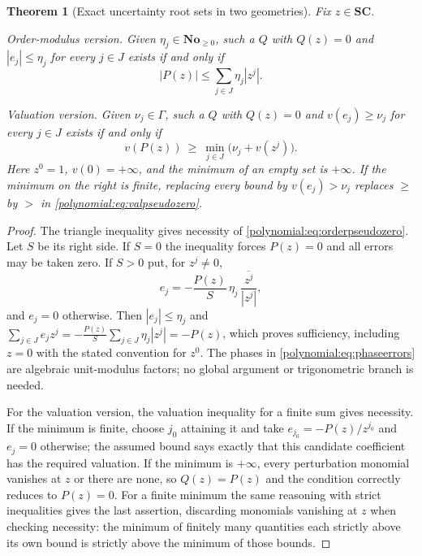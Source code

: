 \documentclass[11pt,letterpaper]{article}
\numberwithin{equation}{section}
\newtheorem{theorem}{Theorem}[section]
\theoremstyle{definition}
\theoremstyle{remark}\newtheorem{remark}[theorem]{Remark}
\newcommand{\No}{\mathbf{No}}
\newcommand{\SC}{\mathbf{SC}}
\begin{document}
\begin{theorem}[Exact uncertainty root sets in two geometries]
\label{polynomial:thm:pseudozeros}
Fix $z\in\SC$.

\emph{Order-modulus version.} Given $\eta_j\in\No_{\ge0}$, such a $Q$ with
$Q(z)=0$ and $|e_j|\le\eta_j$ for every $j\in J$ exists \emph{if and only if}
\begin{equation}\label{polynomial:eq:orderpseudozero}
 |P(z)|\le\sum_{j\in J}\eta_j|z^j| .
\end{equation}

\emph{Valuation version.} Given $\nu_j\in\Gamma$, such a $Q$ with $Q(z)=0$ and
$v(e_j)\ge\nu_j$ for every $j\in J$ exists \emph{if and only if}
\begin{equation}\label{polynomial:eq:valpseudozero}
 v(P(z))\ \ge\ \min_{j\in J}\bigl(\nu_j+v(z^j)\bigr).
\end{equation}
Here $z^0=1$, $v(0)=+\infty$, and the minimum of an empty set is $+\infty$. If
the minimum on the right is finite, replacing every bound by $v(e_j)>\nu_j$
replaces $\ge$ by $>$ in \eqref{polynomial:eq:valpseudozero}.
\end{theorem}
\begin{proof}
The triangle inequality gives necessity of
\eqref{polynomial:eq:orderpseudozero}. Let $S$ be its right side. If $S=0$ the
inequality forces $P(z)=0$ and all errors may be taken zero. If $S>0$ put, for
$z^j\ne0$,
\begin{equation}\label{polynomial:eq:phaseerrors}
 e_j=-\frac{P(z)}{S}\,\eta_j\,\frac{\overline{z^j}}{|z^j|},
\end{equation}
and $e_j=0$ otherwise. Then $|e_j|\le\eta_j$ and
$\sum_{j\in J}e_jz^j=-\frac{P(z)}{S}\sum_{j\in J}\eta_j|z^j|=-P(z)$, which
proves sufficiency, including $z=0$ with the stated convention for $z^0$. The
phases in \eqref{polynomial:eq:phaseerrors} are algebraic unit-modulus
factors; no global argument or trigonometric branch is needed.

For the valuation version, the valuation inequality for a finite sum gives
necessity. If the minimum is finite, choose $j_0$ attaining it and take
$e_{j_0}=-P(z)/z^{j_0}$ and $e_j=0$ otherwise; the assumed bound says exactly
that this candidate coefficient has the required valuation. If the minimum is
$+\infty$, every perturbation monomial vanishes at $z$ or there are none, so
$Q(z)=P(z)$ and the condition correctly reduces to $P(z)=0$. For a finite
minimum the same reasoning with strict inequalities gives the last assertion,
discarding monomials vanishing at $z$ when checking necessity: the minimum of
finitely many quantities each strictly above its own bound is strictly above
the minimum of those bounds.
\end{proof}
\end{document}
